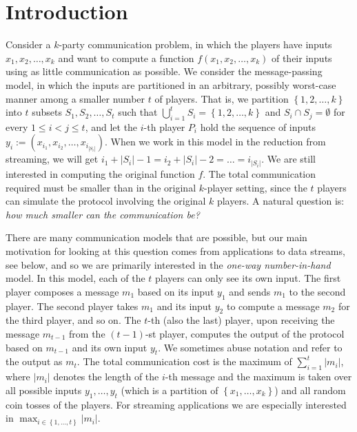 \documentclass[11pt]{article}
\numberwithin{equation}{section}
\theoremstyle{definition}
\theoremstyle{plain}
\newcommand{\set}[1]{{\left \{{#1} \right \}}}
\newcommand{\intersect}{\ensuremath{\cap}}
\newcommand{\eqdef}{\ensuremath{:=}}
\begin{document}
%
%
%


\section{Introduction}
\label{sec:intro}

Consider a $k$-party communication problem, in which the players have inputs $x_1, x_2, \ldots, x_k$ %
 and want to compute a function $f(x_1, x_2, \ldots, x_k)$ of their inputs using as little communication as possible. 
We consider the message-passing model, in which the inputs are partitioned in an arbitrary, possibly worst-case manner among a smaller number $t$ of players. 
That is, we partition $\set{1,2,\dots,k}$ into $t$ subsets $S_1, S_2, \ldots, S_t$ such that %
$\bigcup_{i=1}^t S_i = \set{1,2,\dots,k}$ %
and $S_i\intersect S_j = \emptyset$ for every $1\le i< j\le t$,
and let the $i$-th player $P_i$ hold the sequence of inputs $y_i\eqdef \left(x_{i_1}, x_{i_2}, \ldots, x_{i_{|S_i|}}\right)$. When we work in this model in the reduction from streaming, we will get $i_1 + |S_i|-1 = i_2+|S_i|-2 = \dots = i_{|S_i|}$.
We are still interested in computing the original function $f$.
The total communication required must be smaller than in the original $k$-player setting, since the $t$ players can simulate the protocol involving the original $k$ players. 
A natural question is: \emph{how much smaller can the communication be?}

There are many communication models that are possible, but our main motivation for looking at this question comes from applications to data streams, see below, and so we are primarily interested in the \emph{one-way number-in-hand} model. In this model, each of the $t$ players can only see its own input. 
The first player composes a message $m_1$ based on its input $y_1$ and sends $m_1$ to the second player. 
The second player takes $m_1$ and its input $y_2$ to compute a message $m_2$ for the third player, and so on. 
The $t$-th (also the last) player, upon receiving the message $m_{t-1}$ from the $(t-1)$-st player, computes the output of the protocol based on $m_{t-1}$ and its own input $y_t$. We sometimes abuse notation and refer to the output as $m_t$. 
The total communication cost is the maximum of $\sum_{i=1}^{t} |m_i|$, where $|m_i|$ denotes the length of the $i$-th message and the maximum is taken over all possible inputs $y_1,\ldots, y_t$ (which is a partition of $\set{x_1, \ldots, x_k}$) and all random coin tosses of the players. 
For streaming applications we are especially interested in $\max_{i\in\set{1, \ldots, t}} |m_i|$. 
\end{document}
